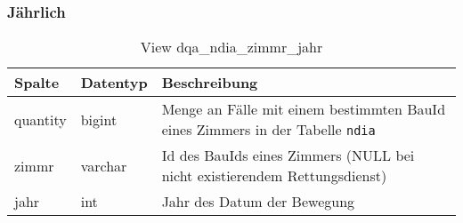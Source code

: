 \subsubsection{Jährlich} \label{subsubsec:bewZimmrJ}

\begin{table}[ht]
	\centering   
	\caption{View dqa\_ndia\_zimmr\_jahr}
	\label{tab:bewZimmrJ}
	\begin{tabular}{||l|l|p{10cm}||}
		\hline
		Spalte & Datentyp & Beschreibung \\ [0.5ex]
		\hline\hline
		quantity & bigint & Menge an Fälle mit einem bestimmten BauId eines Zimmers in der Tabelle \texttt{ndia}\\
		\hline
		zimmr & varchar & Id des BauIds eines Zimmers (NULL bei nicht existierendem Rettungsdienst)\\
		\hline
		jahr & int &  Jahr des Datum der Bewegung \\
		\hline		
	\end{tabular}
\end{table}